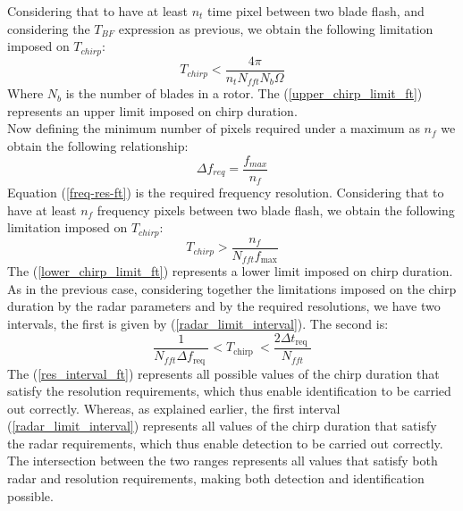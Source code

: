 Considering that to have at least $n_{t}$ time pixel between two blade flash, and considering the $T_{BF}$ expression as previous, we obtain the following limitation imposed on $T_{chirp}$:
\begin{equation}
T_{chirp}<\frac{4 \pi}{n_{t} N_{fft} N_{b} \Omega}
\label{upper_chirp_limit_ft}
\end{equation}
Where $N_{b}$ is the number of blades in a rotor. The (\ref{upper_chirp_limit_ft}) represents an upper limit imposed on chirp duration. \\
Now defining the minimum number of pixels required under a maximum as $n_{f}$ we obtain the following relationship:
\begin{equation}
\Delta f_{req}=\frac{f_{max}}{n_{f}} 
\label{freq-res-ft}
\end{equation}
Equation (\ref{freq-res-ft}) is the required frequency resolution.
Considering that to have at least $n_{f}$ frequency pixels between two blade flash, we obtain the following limitation imposed on $T_{chirp}$:
\begin{equation}
T_{chirp}>\frac{n_{f}}{N_{fft} f_{\max }}
\label{lower_chirp_limit_ft}
\end{equation}
The (\ref{lower_chirp_limit_ft}) represents a lower limit imposed on chirp duration. As in the previous case, considering together the limitations imposed on the chirp duration by the radar parameters and by the required resolutions, we have two intervals, the first is given by (\ref{radar_limit_interval}). The second is:
\begin{equation}
\frac{1}{N_{fft} \Delta f_{\text {req }}}<T_{\text {chirp }}<\frac{2 \Delta t_{\text {req }}}{N_{fft}}
\label{res_interval_ft}
\end{equation}
The (\ref{res_interval_ft}) represents all possible values of the chirp duration that satisfy the resolution requirements, which thus enable identification to be carried out correctly. Whereas, as explained earlier, the first interval (\ref{radar_limit_interval}) represents all values of the chirp duration that satisfy the radar requirements, which thus enable detection to be carried out correctly. The intersection between the two ranges represents all values that satisfy both radar and resolution requirements, making both detection and identification possible.



